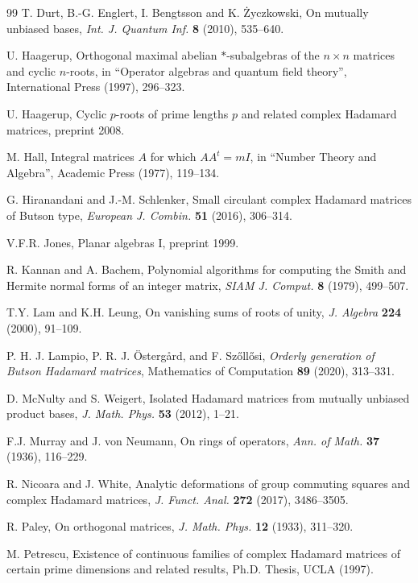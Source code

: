 \documentclass[11pt,a4paper]{article}
\theoremstyle{plain}
\theoremstyle{definition}
\numberwithin{equation}{section}
\begin{document}
\begin{thebibliography}{99}
 T. Durt, B.-G. Englert, I. Bengtsson and K. \.Zyczkowski, On mutually unbiased bases, {\em Int. J. Quantum Inf.} {\bf 8} (2010), 535--640.

 U. Haagerup, Orthogonal maximal abelian $*$-subalgebras of the $n\times n$ matrices and cyclic $n$-roots, in ``Operator algebras and quantum field theory'', International Press (1997), 296--323.

 U. Haagerup, Cyclic $p$-roots of prime lengths $p$ and related complex Hadamard matrices, preprint 2008.

 M. Hall, Integral matrices $A$ for which $AA^t=mI$, in ``Number Theory and Algebra'', Academic Press (1977), 119--134.

 G. Hiranandani and J.-M. Schlenker, Small circulant complex Hadamard matrices of Butson type, {\em European J. Combin.} {\bf 51} (2016), 306--314.

 V.F.R. Jones, Planar algebras I, preprint 1999.

 R. Kannan and A. Bachem, Polynomial algorithms for computing the Smith and Hermite normal forms of an integer matrix, {\em SIAM J. Comput.} {\bf 8} (1979), 499--507.

 T.Y. Lam and K.H. Leung, On vanishing sums of roots of unity, {\em J. Algebra} {\bf 224} (2000), 91--109.

 P. H. J. Lampio, P. R. J. \"Osterg\aa rd, and F. Sz\H{o}ll\H{o}si, \emph{Orderly generation of Butson Hadamard matrices}, Mathematics of Computation \textbf{89} (2020), 313--331.

 D. McNulty and S. Weigert, Isolated Hadamard matrices from mutually unbiased product bases, {\em J. Math. Phys.} {\bf 53} (2012), 1--21.

 F.J. Murray and J. von Neumann, On rings of operators, {\em Ann. of Math.} {\bf 37} (1936), 116--229.

 R. Nicoara and J. White, Analytic deformations of group commuting squares and complex Hadamard matrices, {\em J. Funct. Anal.} {\bf 272} (2017), 3486--3505.

 R. Paley, On orthogonal matrices, {\em J. Math. Phys.} {\bf 12} (1933), 311--320.

 M. Petrescu, Existence of continuous families of complex Hadamard matrices of certain prime dimensions and related results, Ph.D. Thesis, UCLA (1997).


\end{thebibliography}
\end{document}
